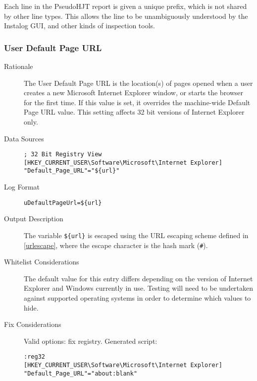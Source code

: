 \documentclass[letterpaper,12pt]{article}
\newcommand{\var}[1]{\texttt{\$\{#1\}}}
\begin{document}
Each line in the PseudoHJT report is given a unique prefix, which is not shared
by other line types. This allows the line to be unambiguously understood by the
Instalog GUI, and other kinds of inspection tools.

\subsubsection{User Default Page URL}
\begin{description}
\item[Rationale] The User Default Page URL is the location(s) of pages
opened when a user creates a new Microsoft Internet Explorer window, or starts
the browser for the first time. If this value is set, it overrides the
machine-wide Default Page URL value. This setting affects 32 bit versions of
Internet Explorer only.
\item[Data Sources] \hfill
\vspace{-\baselineskip}
\begin{verbatim}
; 32 Bit Registry View
[HKEY_CURRENT_USER\Software\Microsoft\Internet Explorer]
"Default_Page_URL"="${url}"
\end{verbatim}
\item[Log Format] \hfill
\vspace{-\baselineskip}
\begin{verbatim} 
uDefaultPageUrl=${url}
\end{verbatim}
\item[Output Description] The variable \var{url} is escaped using the
URL escaping scheme defined in \ref{urlescape}, where the escape character is the
hash mark (\verb|#|). 
\item[Whitelist Considerations] The default value for this entry
differs depending on the version of Internet Explorer and Windows currently in
use. Testing will need to be undertaken against supported operating systems in
order to determine which values to hide.
\item[Fix Considerations] Valid options: fix registry. Generated script:
\vspace{-\baselineskip}
\begin{verbatim}
:reg32
[HKEY_CURRENT_USER\Software\Microsoft\Internet Explorer]
"Default_Page_URL"="about:blank"
\end{verbatim}
\end{description}
\end{document}
